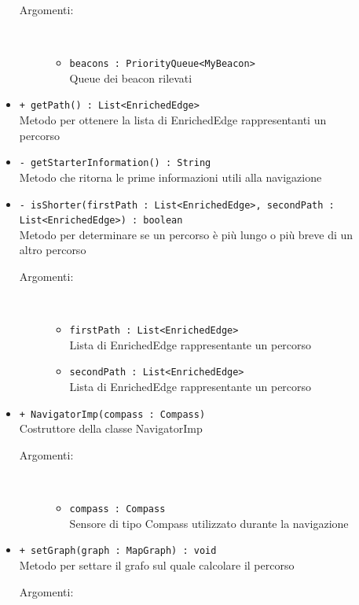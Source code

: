 \documentclass[../DefinizioneDiProdotto.tex]{subfiles}
\begin{document}
\begin{description}
\begin{itemize}
\begin{description}
\item[Argomenti:] \
\begin{itemize}
\item \texttt{beacons : PriorityQueue<MyBeacon>}\\
Queue dei beacon rilevati\end{itemize}
\end{description}
\item \texttt{+ getPath() : List<EnrichedEdge>}\\
Metodo per ottenere la lista di EnrichedEdge rappresentanti un percorso
 \item \texttt{- getStarterInformation() : String}\\
Metodo che ritorna le prime informazioni utili alla navigazione
 \item \texttt{- isShorter(firstPath : List<EnrichedEdge>, secondPath : List<EnrichedEdge>) : boolean}\\
Metodo per determinare se un percorso è più lungo o più breve di un altro percorso
 \begin{description}
\item[Argomenti:] \
\begin{itemize}
\item \texttt{firstPath : List<EnrichedEdge>}\\
Lista di EnrichedEdge rappresentante un percorso\item \texttt{secondPath : List<EnrichedEdge>}\\
Lista di EnrichedEdge rappresentante un percorso\end{itemize}
\end{description}
\item \texttt{+ NavigatorImp(compass : Compass)}\\
Costruttore della classe NavigatorImp
 \begin{description}
\item[Argomenti:] \
\begin{itemize}
\item \texttt{compass : Compass}\\
Sensore di tipo Compass utilizzato durante la navigazione\end{itemize}
\end{description}
\item \texttt{+ setGraph(graph : MapGraph) : void}\\
Metodo per settare il grafo sul quale calcolare il percorso
 \begin{description}
\item[Argomenti:] \

\end{description}
\end{itemize}
\end{description}
\end{document}
